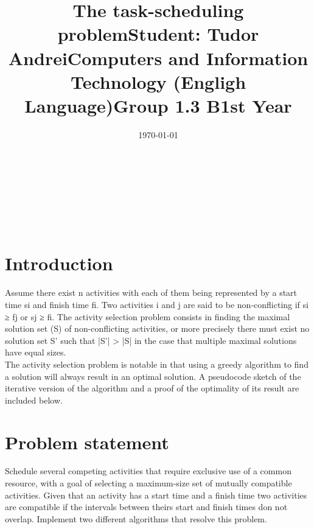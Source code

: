 \documentclass[14pt]{article}
\begin{document}
\title{\huge The task-scheduling problem}
\date{\today}
\maketitle
\begin{center}
\vspace{30 mm}

\title{\huge Student: Tudor Andrei}
\\\vspace{10 mm}
\title{\huge Computers and Information Technology (Engligh Language)}
\\\vspace{10 mm}
\title{\huge Group 1.3 B}
\\\vspace{10 mm}
\title{\huge 1st Year}
\date{}
\maketitle

\newpage
\section*{Introduction}
\vspace{20 mm}
Assume there exist n activities with each of them being represented by a start time si and finish time fi. Two activities i and j are said to be non-conflicting if si ≥ fj or sj ≥ fi. The activity selection problem consists in finding the maximal solution set (S) of non-conflicting activities, or more precisely there must exist no solution set S' such that |S'| > |S| in the case that multiple maximal solutions have equal sizes.
\\\vspace{10 mm}
The activity selection problem is notable in that using a greedy algorithm to find a solution will always result in an optimal solution. A pseudocode sketch of the iterative version of the algorithm and a proof of the optimality of its result are included below. 

\newpage
\end{center}
\section*{Problem statement}
Schedule several competing activities that require
exclusive use of a common resource, with a goal of selecting a maximum-size
set of mutually compatible activities. Given that an activity has a start time and a
finish time two activities are compatible if the intervals between theirs start and
finish times don not overlap. Implement two different algorithms that resolve this
problem.
\end{document}
